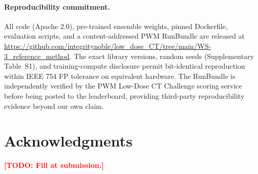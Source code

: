 \documentclass{article}  %
\newcommand{\todo}[1]{\textcolor{red}{\textbf{[TODO: #1]}}}
\begin{document}
\paragraph{Reproducibility commitment.} All code (Apache 2.0), pre-trained ensemble weights, pinned Dockerfile, evaluation scripts, and a content-addressed PWM RunBundle are released at \url{https://github.com/integritynoble/low_dose_CT/tree/main/WS-3_reference_method}. The exact library versions, random seeds (Supplementary Table~S1), and training-compute disclosure permit bit-identical reproduction within IEEE 754 FP tolerance on equivalent hardware. The RunBundle is independently verified by the PWM Low-Dose CT Challenge scoring service before being posted to the leaderboard, providing third-party reproducibility evidence beyond our own claim.

\section*{Acknowledgments}
\todo{Fill at submission.}



\end{document}
